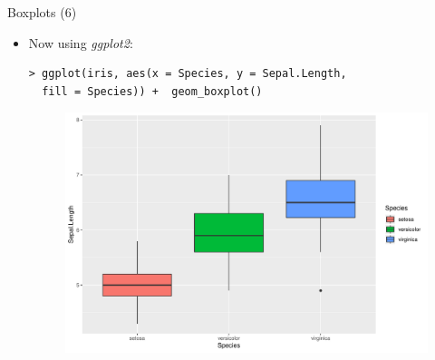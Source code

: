 \documentclass[handout]{beamer}
\begin{document}
\begin{frame}[fragile]{Boxplots (6)}
\scriptsize{
\begin{itemize}

\item Now using \emph{ggplot2}:
\begin{verbatim}
> ggplot(iris, aes(x = Species, y = Sepal.Length, 
  fill = Species)) +  geom_boxplot()
\end{verbatim}

 \begin{figure}[h!]
	\centering
	\includegraphics[scale=0.4]{pics/boxplotggplot2.pdf}		
\end{figure} 
 
\end{itemize}

}
\end{frame}
\end{document}
